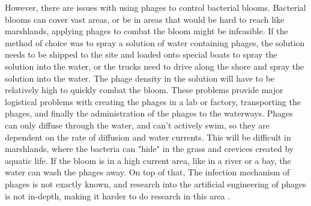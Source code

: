 However, there are issues with using phages to control bacterial blooms. Bacterial blooms can cover vast areas, or be in areas that would be hard to reach like marshlands, applying phages to combat the bloom might be infeasible. If the method of choice was to spray a solution of water containing phages, the solution needs to be shipped to the site and loaded onto special boats to spray the solution into the water, or the trucks need to drive along the shore and spray the solution into the water. The phage density in the solution will have to be relatively high to quickly combat the bloom. These problems provide major logistical problems with creating the phages in a lab or factory, transporting the phages, and finally the administration of the phages to the waterways. Phages can only diffuse through the water, and can't actively swim, so they are dependent on the rate of diffusion and water currents. This will be difficult in marshlands, where the bacteria can "hide" in the grass and crevices created by aquatic life. If the bloom is in a high current area, like in a river or a bay, the water can wash the phages away. On top of that, The infection mechanism of phages is not exactly known, and research into the artificial engineering of phages is not in-depth, making it harder to do research in this area \cite{grassoReviewCyanophageHost2022, DissolvedMicrocystinRelease}. 